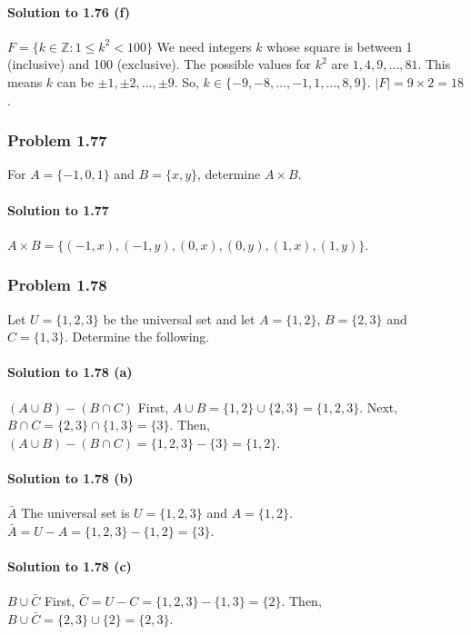 \documentclass{article}
\begin{document}
\paragraph*{Solution to 1.76 (f)}
$F = \{k \in \mathbb{Z} : 1 \le k^2 < 100\}$
We need integers $k$ whose square is between 1 (inclusive) and 100 (exclusive).
The possible values for $k^2$ are $1, 4, 9, \dots, 81$.
This means $k$ can be $\pm 1, \pm 2, \dots, \pm 9$.
So, $k \in \{-9, -8, \dots, -1, 1, \dots, 8, 9\}$.
$|F| = 9 \times 2 = 18$.

\subsubsection*{Problem 1.77}
For $A = \{-1, 0, 1\}$ and $B = \{x, y\}$, determine $A \times B$.

\paragraph*{Solution to 1.77}
$A \times B = \{(-1, x), (-1, y), (0, x), (0, y), (1, x), (1, y)\}$.

\subsubsection*{Problem 1.78}
Let $U = \{1, 2, 3\}$ be the universal set and let $A = \{1, 2\}$, $B = \{2, 3\}$ and $C = \{1, 3\}$. Determine the following.

\paragraph*{Solution to 1.78 (a)}
$(A \cup B) - (B \cap C)$
First, $A \cup B = \{1, 2\} \cup \{2, 3\} = \{1, 2, 3\}$.
Next, $B \cap C = \{2, 3\} \cap \{1, 3\} = \{3\}$.
Then, $(A \cup B) - (B \cap C) = \{1, 2, 3\} - \{3\} = \{1, 2\}$.

\paragraph*{Solution to 1.78 (b)}
$\bar{A}$
The universal set is $U = \{1, 2, 3\}$ and $A = \{1, 2\}$.
$\bar{A} = U - A = \{1, 2, 3\} - \{1, 2\} = \{3\}$.

\paragraph*{Solution to 1.78 (c)}
$B \cup \bar{C}$
First, $\bar{C} = U - C = \{1, 2, 3\} - \{1, 3\} = \{2\}$.
Then, $B \cup \bar{C} = \{2, 3\} \cup \{2\} = \{2, 3\}$.
\end{document}
